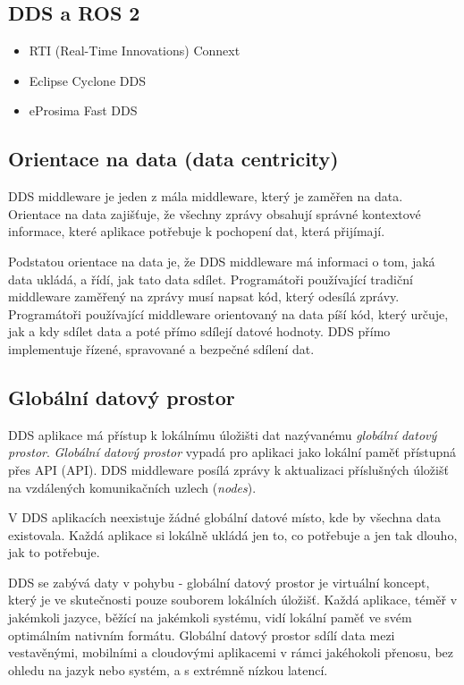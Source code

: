 \subsection{\acs{DDS} a ROS 2}

\cite{ROS2DDS}

\begin{itemize}
    \item RTI (Real-Time Innovations) Connext
    \item Eclipse Cyclone DDS
    \item eProsima Fast DDS
\end{itemize}

\subsection{Orientace na data (data centricity)}

\acs{DDS} middleware je jeden z mála middleware, který je zaměřen na data. Orientace na data zajišťuje, že všechny zprávy obsahují správné kontextové informace, které aplikace potřebuje k pochopení dat, která přijímají.

Podstatou orientace na data je, že \acs{DDS} middleware má informaci o tom, jaká data ukládá, a řídí, jak tato data sdílet. Programátoři používající tradiční middleware zaměřený na zprávy musí napsat kód, který odesílá zprávy. Programátoři používající middleware orientovaný na data píší kód, který určuje, jak a kdy sdílet data a poté přímo sdílejí datové hodnoty. \acs{DDS} přímo implementuje řízené, spravované a bezpečné sdílení dat. \cite{DDS_Main}

\subsection{Globální datový prostor}

\acs{DDS} aplikace má přístup k lokálnímu úložišti dat nazývanému \textit{globální datový prostor}. \textit{Globální datový prostor} vypadá pro aplikaci jako lokální paměť přístupná přes \acs{API} (\acl{API}). \acs{DDS} middleware posílá zprávy k aktualizaci příslušných úložišť na vzdálených komunikačních uzlech (\textit{nodes}).

V \acs{DDS} aplikacích neexistuje žádné globální datové místo, kde by všechna data existovala. Každá aplikace si lokálně ukládá jen to, co potřebuje a jen tak dlouho, jak to potřebuje. \cite{DDS_Main}

\acs{DDS} se zabývá daty v pohybu - globální datový prostor je virtuální koncept, který je ve skutečnosti pouze souborem lokálních úložišť. Každá aplikace, téměř v jakémkoli jazyce, běžící na jakémkoli systému, vidí lokální paměť ve svém optimálním nativním formátu. Globální datový prostor sdílí data mezi vestavěnými, mobilními a cloudovými aplikacemi v rámci jakéhokoli přenosu, bez ohledu na jazyk nebo systém, a s extrémně nízkou latencí.

